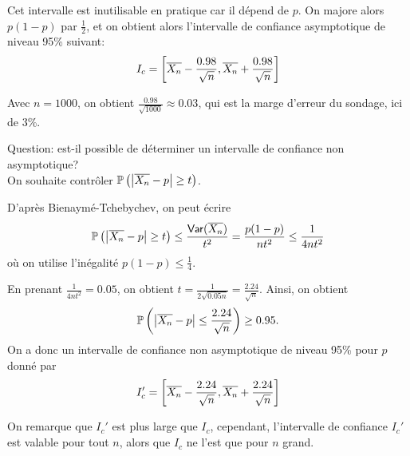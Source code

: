 \begin{example}
    Cet intervalle est inutilisable en pratique car il dépend de \(p\).
    On majore alors \(p(1-p)\) par \(\frac12\), et on obtient
    alors l'intervalle de confiance asymptotique de niveau 95\%
    suivant:
    \begin{equation*}
        I_c = \mathopen{}\left[\overline{X_n}-\frac{0.98}{\sqrt{n}},\overline{X_n}+\frac{0.98}{\sqrt{n}}\right]\mathclose{}
    \end{equation*}

    Avec \(n=1000\), on obtient \(\frac{0.98}{\sqrt{1000}}\approx 0.03\),
    qui est la marge d'erreur du sondage, ici de 3\%.
    
    \ptr{} Question: est-il possible de déterminer un intervalle de confiance 
    non asymptotique?\\
    On souhaite contrôler \(\mathbb{P}\left(\mathopen{}\left|\overline{X_n}-p\right|\mathclose{}\geq t\right)\).

    D'après Bienaymé-Tchebychev, on peut écrire
    \begin{equation*}
        \mathbb{P}\left(\mathopen{}\left|\overline{X_n}-p\right|\mathclose{}\geq t\right) \leq \frac{\operatorname{\mathsf{Var}}(\overline{X_n})}{t^2} = \frac{p(1-p)}{nt^2} \leq \frac{1}{4nt^2}
    \end{equation*}
    où on utilise l'inégalité \(p(1-p)\leq \frac14\).

    En prenant \(\frac{1}{4nt^2} = 0.05\), on obtient \(t=\frac{1}{2\sqrt{0.05n}} = \frac{2.24}{\sqrt{n}}\).
    Ainsi, on obtient
    \begin{equation*}
        \mathbb{P}\left(\mathopen{}\left|\overline{X_n}-p\right|\mathclose{}\leq \frac{2.24}{\sqrt{n}}\right) \geq 0.95.
    \end{equation*}
    On a donc un intervalle de confiance non asymptotique de niveau 95\%
    pour \(p\) donné par
    \begin{equation*}
        I_c'=\mathopen{}\left[\overline{X_n}-\frac{2.24}{\sqrt{n}},\overline{X_n}+\frac{2.24}{\sqrt{n}}\right]\mathclose{}
    \end{equation*}

    On remarque que \(I_c'\) est plus large que \(I_c\),
    cependant, l'intervalle de confiance \(I_c'\) est
    valable pour tout \(n\), alors que \(I_c\) ne l'est
    que pour \(n\) grand.

\end{example}
